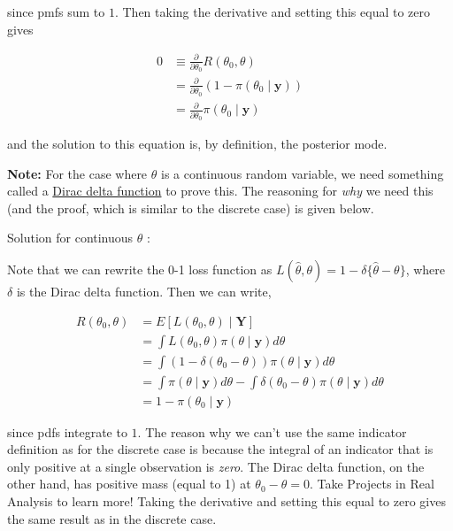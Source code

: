\documentclass[
  letterpaper,
  DIV=11,
  numbers=noendperiod]{scrreprt}
\begin{document}
since pmfs sum to \(1\). Then taking the derivative and setting this
equal to zero gives

\begin{align*}
    0 & \equiv \frac{\partial}{\partial \theta_0} R(\theta_0, \theta) \\
    & = \frac{\partial}{\partial \theta_0}  \left( 1 - \pi(\theta_0 \mid \textbf{y}) \right) \\
    & = \frac{\partial}{\partial \theta_0} \pi(\theta_0 \mid \textbf{y})
\end{align*}

and the solution to this equation is, by definition, the posterior mode.

\textbf{Note:} For the case where \(\theta\) is a continuous random
variable, we need something called a
\href{https://en.wikipedia.org/wiki/Dirac_delta_function}{Dirac delta
function} to prove this. The reasoning for \emph{why} we need this (and
the proof, which is similar to the discrete case) is given below.

Solution for continuous \(\theta\) :

Note that we can rewrite the 0-1 loss function as
\(L(\hat{\theta},\theta) = 1 - \delta\{\hat{\theta} - \theta\}\), where
\(\delta\) is the Dirac delta function. Then we can write,

\begin{align*}
    R(\theta_0, \theta) & = E[L(\theta_0, \theta) \mid \textbf{Y}] \\
    & = \int L(\theta_0, \theta) \pi(\theta \mid \textbf{y}) d\theta \\
    & = \int \left( 1 - \delta(\theta_0 - \theta) \right) \pi(
    \theta \mid \textbf{y} ) d\theta  \\
    & = \int \pi(
    \theta \mid \textbf{y} ) d\theta  - \int \delta(\theta_0 - \theta) \pi(
    \theta \mid \textbf{y}) d\theta   \\
    & = 1 - \pi(\theta_0 \mid \textbf{y})
\end{align*}

since pdfs integrate to \(1\). The reason why we can't use the same
indicator definition as for the discrete case is because the integral of
an indicator that is only positive at a single observation is
\emph{zero}. The Dirac delta function, on the other hand, has positive
mass (equal to 1) at \(\theta_0 - \theta = 0\). Take Projects in Real
Analysis to learn more! Taking the derivative and setting this equal to
zero gives the same result as in the discrete case.
\end{document}
